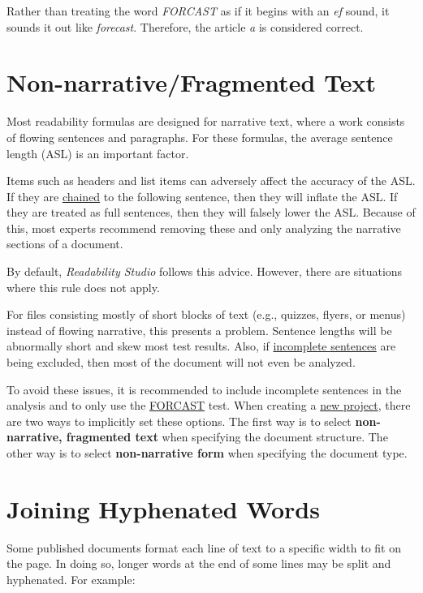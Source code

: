 \documentclass[
]{book}
\theoremstyle{definition}
\theoremstyle{definition}
\theoremstyle{definition}
\theoremstyle{definition}
\theoremstyle{remark}
\begin{document}
Rather than treating the word \emph{FORCAST} as if it begins with an \emph{ef} sound, it sounds it out like \emph{forecast}. Therefore, the article \emph{a} is considered correct.

\hypertarget{framented-text}{%
\section{Non-narrative/Fragmented Text}\label{framented-text}}

Most readability formulas are designed for narrative text, where a work consists of flowing sentences and paragraphs. For these formulas, the average sentence length (ASL) is an important factor.

Items such as headers and list items can adversely affect the accuracy of the ASL. If they are \protect\hyperlink{line-chaining}{chained} to the following sentence, then they will inflate the ASL. If they are treated as full sentences, then they will falsely lower the ASL. Because of this, most experts recommend removing these and only analyzing the narrative sections of a document.

By default, \emph{Readability Studio} follows this advice. However, there are situations where this rule does not apply.

For files consisting mostly of short blocks of text (e.g., quizzes, flyers, or menus) instead of flowing narrative, this presents a problem. Sentence lengths will be abnormally short and skew most test results. Also, if \protect\hyperlink{how-text-is-excluded}{incomplete sentences} are being excluded, then most of the document will not even be analyzed.

To avoid these issues, it is recommended to include incomplete sentences in the analysis and to only use the \protect\hyperlink{forcast-test}{FORCAST} test. When creating a \protect\hyperlink{creating-standard-project}{new project}, there are two ways to implicitly set these options. The first way is to select \textbf{non-narrative, fragmented text} when specifying the document structure. The other way is to select \textbf{non-narrative form} when specifying the document type.

\hypertarget{joining-hyphenated-words}{%
\section{Joining Hyphenated Words}\label{joining-hyphenated-words}}

Some published documents format each line of text to a specific width to fit on the page. In doing so, longer words at the end of some lines may be split and hyphenated. For example:
\end{document}
